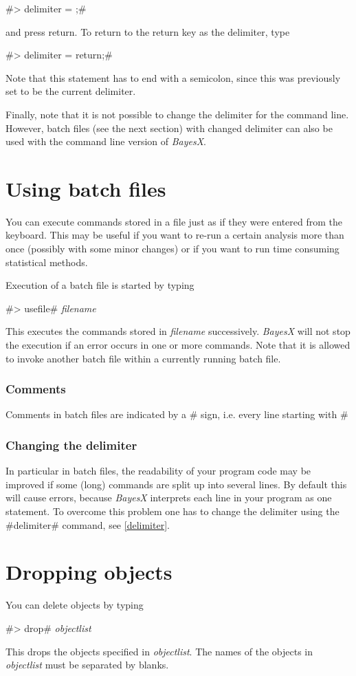 #> delimiter = ;#

and press return. To return to the return key as the delimiter, type

#> delimiter = return;#

Note that this statement has to end with a semicolon, since this was previously set to be the current delimiter.

Finally, note that it is not possible to change the delimiter for the command line. However, batch files (see the next section)
with changed delimiter can also be used with the command line version of {\it BayesX}.

\section{Using batch files}
\label{batch} 

You can execute commands stored in a file just as if they were
entered from the keyboard. This may be useful if you want to
re-run a certain analysis more than once (possibly with some minor
changes) or if you want to run time consuming statistical methods.

Execution of a batch file is started by typing

#> usefile# {\em filename}

This executes the commands stored in {\em filename} successively.
{\em BayesX} will not stop the execution if an error occurs in one
or more commands. Note that it is allowed to invoke another batch
file within a currently running batch file.


\subsubsection*{Comments}

Comments in batch files are indicated by a  #%
sign, i.e. every line 
starting with #%

\subsubsection*{Changing the delimiter}

In particular in batch files, the readability of your program code
may be improved if some (long) commands are split up into several
lines. By default this will cause errors, because {\em BayesX}
interprets each line in your program as one statement. To overcome
this problem one has to change the delimiter using the #delimiter#
command, see \autoref{delimiter}.

\section{Dropping objects}
 

You can delete objects by typing

#> drop# {\em objectlist}

This drops the objects specified in {\em objectlist}. The names of
the objects in {\em objectlist} must be separated by blanks.

